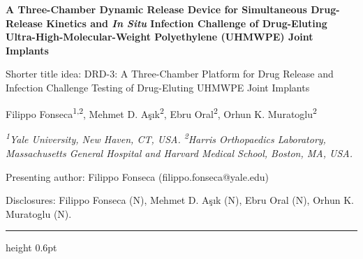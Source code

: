 \documentclass[8pt]{extarticle}
\begin{document}
\begin{center}
  {\fontsize{10}{12}\selectfont\bfseries
   A Three-Chamber Dynamic Release Device for Simultaneous Drug-Release Kinetics
   and \textit{In Situ} Infection Challenge of Drug-Eluting Ultra-High-Molecular-Weight
   Polyethylene (UHMWPE) Joint Implants\par}
   Shorter title idea: DRD-3: A Three-Chamber Platform for Drug Release and Infection Challenge Testing of Drug-Eluting UHMWPE Joint Implants
   
  \vspace{5pt}
  {\fontsize{8}{10}\selectfont
   Filippo Fonseca\textsuperscript{1,2}, Mehmet D. Aşık\textsuperscript{2},
   Ebru Oral\textsuperscript{2}, Orhun K. Muratoglu\textsuperscript{2}\par}
  \vspace{3pt}
  {\fontsize{8}{10}\selectfont\itshape
   \textsuperscript{1}Yale University, New Haven, CT, USA.\quad
   \textsuperscript{2}Harris Orthopaedics Laboratory, Massachusetts General Hospital and
   Harvard Medical School, Boston, MA, USA.\par}
  \vspace{2pt}
  {\fontsize{8}{10}\selectfont Presenting author: Filippo Fonseca \textnormal{(filippo.fonseca@yale.edu)}\par}
  \vspace{1pt}
  {\fontsize{8}{10}\selectfont Disclosures: Filippo Fonseca (N), Mehmet D. Aşık (N), Ebru Oral (N), Orhun K. Muratoglu (N).\par}
\end{center}

\vspace{1pt}
{\color{tealc!60}\hrule height 0.6pt}
\vspace{2pt}
\end{document}
